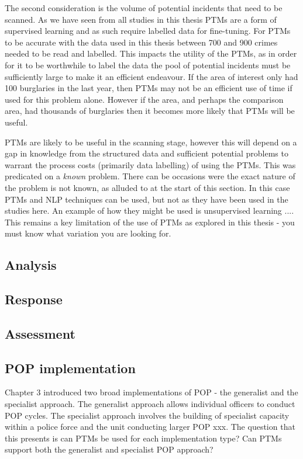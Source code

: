 The second consideration is the volume of potential incidents that need to be scanned. As we have seen from all studies in this thesis PTMs are a form of supervised learning and as such require labelled data for fine-tuning. For PTMs to be accurate with the data used in this thesis between 700 and 900 crimes needed to be read and labelled. This impacts the utility of the PTMs, as in order for it to be worthwhile to label the data the pool of potential incidents must be sufficiently large to make it an efficient endeavour. If the area of interest only had 100 burglaries in the last year, then PTMs may not be an efficient use of time if used for this problem alone. However if the area, and perhaps the comparison area, had thousands of burglaries then it becomes more likely that PTMs will be useful.

PTMs are likely to be useful in the scanning stage, however this will depend on a gap in knowledge from the structured data and sufficient potential problems to warrant the process costs (primarily data labelling) of using the PTMs.  This was predicated on a \emph{known} problem. There can be occasions were the exact nature of the problem is not known, as alluded to at the start of this section. In this case PTMs and NLP techniques can be used, but not as they have been used in the studies here. An example of how they might be used is unsupervised learning .... This remains a key limitation of the use of PTMs as explored in this thesis - you must know what variation you are looking for.     


\subsection{Analysis}
\subsection{Response}
\subsection{Assessment}

\subsection{POP implementation} Chapter 3 introduced two broad implementations of POP - the generalist and the specialist approach. The generalist approach allows individual officers to conduct POP cycles. The specialist approach involves the building of specialist capacity within a police force and the unit conducting larger POP xxx. The question that this presents is can PTMs be used for each implementation type? Can PTMs support both the generalist and specialist POP approach? 

